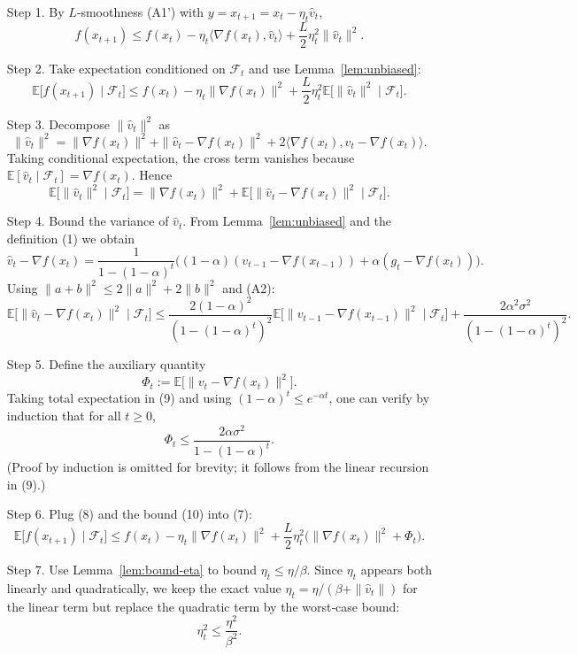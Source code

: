\documentclass{article}
\newcommand{\E}{\mathbb{E}}
\begin{document}
\begin{enumerate}
\item[Step 1.] By $L$‑smoothness (A1') with $y=x_{t+1}=x_t-\eta_t\hat v_t$,
\[
f(x_{t+1})\le f(x_t)-\eta_t\langle\nabla f(x_t),\hat v_t\rangle
+\frac{L}{2}\eta_t^{2}\|\hat v_t\|^{2}.
\tag{6}
\]

\item[Step 2.] Take expectation conditioned on $\mathcal{F}_t$ and use Lemma~\ref{lem:unbiased}:
\[
\E\!\big[f(x_{t+1})\mid\mathcal{F}_t\big]\le
f(x_t)-\eta_t\|\nabla f(x_t)\|^{2}
+\frac{L}{2}\eta_t^{2}\E\!\big[\|\hat v_t\|^{2}\mid\mathcal{F}_t\big].
\tag{7}
\]

\item[Step 3.] Decompose $\|\hat v_t\|^{2}$ as
\[
\|\hat v_t\|^{2}
= \|\nabla f(x_t)\|^{2}
+ \|\hat v_t-\nabla f(x_t)\|^{2}
+2\langle\nabla f(x_t),\hat v_t-\nabla f(x_t)\rangle .
\]
Taking conditional expectation, the cross term vanishes because
$\E[\hat v_t\mid\mathcal{F}_t]=\nabla f(x_t)$. Hence
\[
\E\!\big[\|\hat v_t\|^{2}\mid\mathcal{F}_t\big]
= \|\nabla f(x_t)\|^{2}
+ \E\!\big[\|\hat v_t-\nabla f(x_t)\|^{2}\mid\mathcal{F}_t\big].
\tag{8}
\]

\item[Step 4.] Bound the variance of $\hat v_t$.
From Lemma~\ref{lem:unbiased} and the definition (1) we obtain
\[
\hat v_t-\nabla f(x_t)=\frac{1}{1-(1-\alpha)^{t}}
\Big((1-\alpha)(v_{t-1}-\nabla f(x_{t-1}))
+\alpha(g_t-\nabla f(x_t))\Big).
\]
Using $\|a+b\|^{2}\le2\|a\|^{2}+2\|b\|^{2}$ and (A2):
\[
\E\!\big[\|\hat v_t-\nabla f(x_t)\|^{2}\mid\mathcal{F}_t\big]
\le\frac{2(1-\alpha)^{2}}{(1-(1-\alpha)^{t})^{2}}
\E\!\big[\|v_{t-1}-\nabla f(x_{t-1})\|^{2}\mid\mathcal{F}_t\big]
+\frac{2\alpha^{2}\sigma^{2}}{(1-(1-\alpha)^{t})^{2}} .
\tag{9}
\]

\item[Step 5.] Define the auxiliary quantity
\[
\Phi_t:=\E\!\big[\|v_t-\nabla f(x_t)\|^{2}\big].
\]
Taking total expectation in (9) and using $(1-\alpha)^{t}\le e^{-\alpha t}$,
one can verify by induction that for all $t\ge0$,
\[
\Phi_t\le\frac{2\alpha\sigma^{2}}{1-(1-\alpha)^{t}}.
\tag{10}
\]
(Proof by induction is omitted for brevity; it follows from the linear
recursion in (9).)

\item[Step 6.] Plug (8) and the bound (10) into (7):
\[
\E\!\big[f(x_{t+1})\mid\mathcal{F}_t\big]\le
f(x_t)-\eta_t\|\nabla f(x_t)\|^{2}
+\frac{L}{2}\eta_t^{2}\Big(
\|\nabla f(x_t)\|^{2}+\Phi_t\Big).
\tag{11}
\]

\item[Step 7.] Use Lemma~\ref{lem:bound-eta} to bound $\eta_t\le\eta/\beta$.
Since $\eta_t$ appears both linearly and quadratically, we keep the exact
value $\eta_t=\eta/(\beta+\|\hat v_t\|)$ for the linear term but replace the
quadratic term by the worst‑case bound:
\[
\eta_t^{2}\le\frac{\eta^{2}}{\beta^{2}}.
\tag{12}
\]


\end{enumerate}
\end{document}
